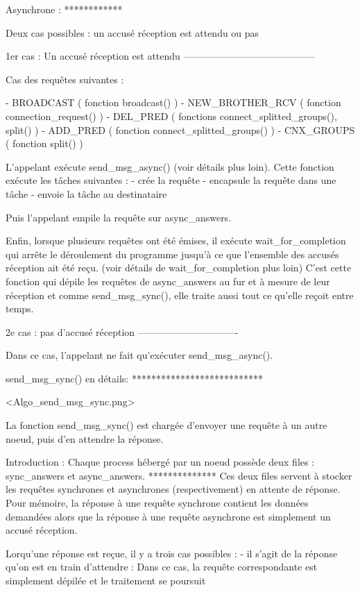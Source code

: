 Asynchrone :
************

Deux cas possibles : un accusé réception est attendu ou pas

1er cas : Un accusé réception est attendu
-----------------------------------------

Cas des requêtes suivantes :

- BROADCAST ( fonction broadcast() )
- NEW_BROTHER_RCV ( fonction connection_request() )
- DEL_PRED ( fonctions connect_splitted_groups(), split() )
- ADD_PRED ( fonction connect_splitted_groups() )
- CNX_GROUPS ( fonction split() )

L'appelant exécute send_msg_async() (voir détails plus loin). Cette fonction exécute les tâches
suivantes :
- crée la requête
- encapsule la requête dans une tâche
- envoie la tâche au destinataire

Puis l'appelant empile la requête sur async_answers.

Enfin, lorsque plusieurs requêtes ont été émises, il exécute wait_for_completion qui arrête le
déroulement du programme jusqu'à ce que l'ensemble des accusés réception ait été reçu. (voir détails
de wait_for_completion plus loin)
C'est cette fonction qui dépile les requêtes de async_answers au fur et à mesure de leur réception
et comme send_msg_sync(), elle traite aussi tout ce qu'elle reçoit entre temps.

2e cas : pas d'accusé réception
-------------------------------

Dans ce cas, l'appelant ne fait qu'exécuter send_msg_async().

send_msg_sync() en détails:
***************************

<Algo_send_msg_sync.png>

La fonction send_msg_sync() est chargée d'envoyer une requête à un autre noeud, puis d'en attendre
la réponse.

Introduction : Chaque process hébergé par un noeud possède deux files : sync_answers et async_answers.
**************
Ces deux files servent à stocker les requêtes synchrones et asynchrones (respectivement) en attente
de réponse. Pour mémoire, la réponse à une requête synchrone contient les données demandées alors
que la réponse à une requête asynchrone est simplement un accusé réception.

Lorqu'une réponse est reçue, il y a trois cas possibles :
- il s'agit de la réponse qu'on est en train d'attendre :
  Dans ce cas, la requête correspondante est simplement dépilée et le traitement se poursuit

